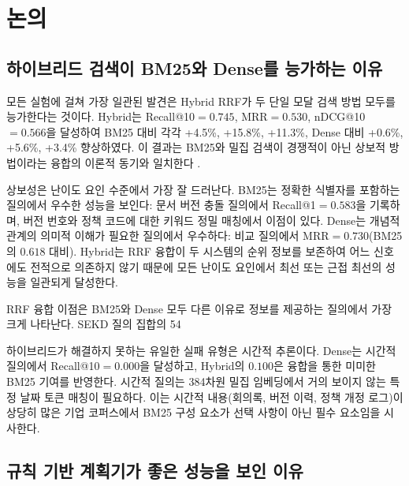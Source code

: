 \chapter{논의}
\label{chap:discussion_ko}

\section{하이브리드 검색이 BM25와 Dense를 능가하는 이유}
\label{sec:disc_hybrid_ko}

모든 실험에 걸쳐 가장 일관된 발견은 Hybrid RRF가 두 단일 모달 검색 방법 모두를 능가한다는 것이다. Hybrid는 Recall@10$={0.745}$, MRR$={0.530}$, nDCG@10$={0.566}$을 달성하여 BM25 대비 각각 +4.5\%, +15.8\%, +11.3\%, Dense 대비 +0.6\%, +5.6\%, +3.4\% 향상하였다. 이 결과는 BM25와 밀집 검색이 경쟁적이 아닌 상보적 방법이라는 융합의 이론적 동기와 일치한다 \citep{cormack2009rrf}.

상보성은 난이도 요인 수준에서 가장 잘 드러난다. BM25는 정확한 식별자를 포함하는 질의에서 우수한 성능을 보인다: 문서 버전 충돌 질의에서 Recall@1$={0.583}$을 기록하며, 버전 번호와 정책 코드에 대한 키워드 정밀 매칭에서 이점이 있다. Dense는 개념적 관계의 의미적 이해가 필요한 질의에서 우수하다: 비교 질의에서 MRR$={0.730}$(BM25의 $0.618$ 대비). Hybrid는 RRF 융합이 두 시스템의 순위 정보를 보존하여 어느 신호에도 전적으로 의존하지 않기 때문에 모든 난이도 요인에서 최선 또는 근접 최선의 성능을 일관되게 달성한다.

RRF 융합 이점은 BM25와 Dense 모두 다른 이유로 정보를 제공하는 질의에서 가장 크게 나타난다. SEKD 질의 집합의 54%

하이브리드가 해결하지 못하는 유일한 실패 유형은 시간적 추론이다. Dense는 시간적 질의에서 Recall@10$={0.000}$을 달성하고, Hybrid의 $0.100$은 융합을 통한 미미한 BM25 기여를 반영한다. 시간적 질의는 384차원 밀집 임베딩에서 거의 보이지 않는 특정 날짜 토큰 매칭이 필요하다. 이는 시간적 내용(회의록, 버전 이력, 정책 개정 로그)이 상당히 많은 기업 코퍼스에서 BM25 구성 요소가 선택 사항이 아닌 필수 요소임을 시사한다.

\section{규칙 기반 계획기가 좋은 성능을 보인 이유}
\label{sec:disc_rule_ko}

